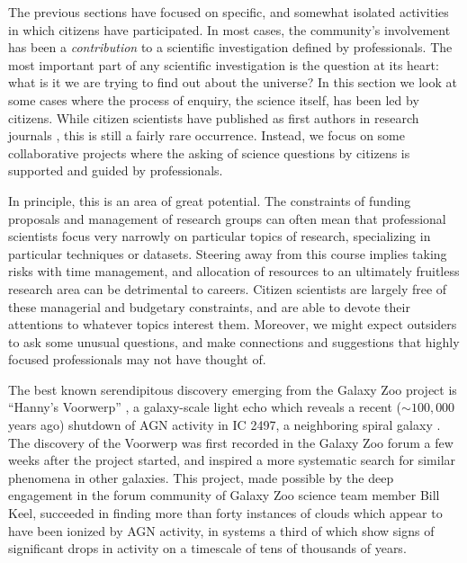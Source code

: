 \documentclass{ar2e}
\def\CaseStudy#1{\noindent{\it\bf #1 \,\,\,\,}}
\begin{document}
The previous sections have focused on specific, and somewhat  isolated
activities in which citizens have participated. In most cases, the community's
involvement has been a {\it contribution} to a scientific investigation defined
by professionals. The most important part of any scientific investigation is the
question at its heart: what is it we are trying to find out about the universe?
In this section we look at some cases where the process of enquiry, the science
itself, has been led by citizens. While citizen scientists have published as
first authors in research journals \citep[see e.g.]{Hui2013,Liang2014},  this is
still a fairly rare occurrence. Instead, we focus on some collaborative projects
where the asking of science questions by citizens is supported and guided by
professionals.

In principle, this is an area of great potential. The constraints of funding
proposals and management of research groups can often mean that professional
scientists focus very narrowly on particular topics of research, specializing in
particular techniques or datasets.  Steering away from this course implies
taking risks with time management, and allocation of resources to an ultimately
fruitless research area can be detrimental to careers.  Citizen scientists are
largely free of these managerial and budgetary constraints, and are able to
devote their attentions to whatever topics interest them. Moreover, we might
expect outsiders to ask some unusual questions, and make connections and
suggestions that highly focused professionals may not have thought of. 



\CaseStudy{The Galaxy Zoo Forum.} 

The best known serendipitous discovery emerging from the Galaxy Zoo project is
``Hanny's Voorwerp'' \citep{Lintott++2009}, a galaxy-scale light echo which
reveals a recent ($\sim 100,000$ years ago)  shutdown of AGN activity in IC
2497, a neighboring spiral galaxy \citep{Keel++2012}. 
The discovery of the Voorwerp was first
recorded in the Galaxy Zoo forum a few weeks after the project started, and
inspired a more systematic search for similar phenomena in other galaxies. This
project, made possible by the deep engagement in the forum community of Galaxy
Zoo science team member Bill Keel, succeeded in finding more than forty
instances of clouds which appear to have been ionized by AGN activity, in
systems a third of which show signs of significant drops in activity on a
timescale of tens of thousands of years.  
\end{document}
